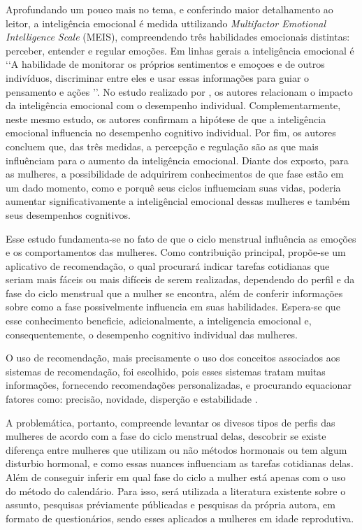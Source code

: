 Aprofundando um pouco mais no tema, e conferindo maior detalhamento ao leitor, a inteligência emocional é medida uttilizando \textit{Multifactor Emotional Intelligence Scale} (MEIS), compreendendo três habilidades emocionais distintas: perceber, entender e regular emoções. Em linhas gerais a inteligência emocional é \lq \lq A habilidade de monitorar os próprios sentimentos e emoçoes e de outros indivíduos, discriminar entre eles e usar essas informações para guiar o pensamento e ações \rq \rq \cite{salovey1990}. No estudo realizado por , os autores relacionam o impacto da inteligência emocional com o desempenho individual. Complementarmente, neste mesmo estudo, os autores confirmam a hipótese de que a inteligência emocional influencia no desempenho cognitivo individual. Por fim, os autores concluem que, das três medidas, a percepção e regulação são as que mais influênciam para o aumento da inteligência emocional. Diante dos exposto, para as mulheres, a possibilidade de adquirirem conhecimentos de que fase estão em um dado momento, como e porquê seus ciclos influemciam suas vidas, poderia aumentar significativamente a inteligêncial emocional dessas mulheres e também seus desempenhos cognitivos. 

Esse estudo fundamenta-se no fato de que o ciclo menstrual influência as emoções e os comportamentos das mulheres. Como contribuição principal, propõe-se um aplicativo de recomendação, o qual procurará indicar tarefas cotidianas que seriam mais fáceis ou mais difíceis de serem realizadas, dependendo do perfil e da fase do ciclo menstrual que a mulher se encontra, além de conferir informações sobre como a fase possivelmente influencia em suas habilidades. Espera-se que esse conhecimento beneficie, adicionalmente, a inteligencia emocional e, consequentemente, o desempenho cognitivo individual das mulheres.

O uso de recomendação, mais precisamente o uso dos conceitos associados aos sistemas de recomendação, foi escolhido, pois esses sistemas tratam muitas informações, fornecendo recomendações personalizadas, e procurando equacionar fatores como: precisão, novidade, disperção e estabilidade \cite{bobadilla2013}.

A problemática, portanto, compreende levantar os divesos tipos de perfis das mulheres de acordo com a fase do ciclo menstrual delas, descobrir se existe diferença entre mulheres que utilizam ou não métodos hormonais ou tem algum disturbio hormonal, e como essas nuances influenciam as tarefas cotidianas delas. Além de conseguir inferir em qual fase do ciclo a mulher está apenas com o uso do método do calendário. Para isso, será utilizada a literatura existente sobre o assunto, pesquisas préviamente públicadas e pesquisas da própria autora, em formato de questionários, sendo esses aplicados a mulheres em idade reprodutiva.

